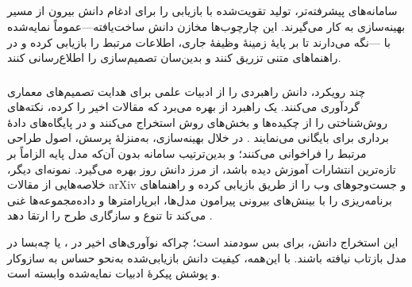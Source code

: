 \subsection[دانش بیرونی از رهگذر تولید تقویت‌شده با بازیابی]{}

سامانه‌های پیشرفته‌تر، تولید تقویت‌شده با بازیابی را برای ادغام دانش بیرون از مسیر بهینه‌سازی به کار می‌گیرند. این چارچوب‌ها مخازن دانش ساخت‌یافته—عموماً  نمایه‌شده با —نگه می‌دارند تا بر پایهٔ زمینهٔ وظیفهٔ جاری، اطلاعات مرتبط را بازیابی کرده و در راهنماهای متنی تزریق کنند و بدین‌سان تصمیم‌سازی را اطلاع‌رسانی کنند.

\subsubsection{\protect{}}

چند رویکرد، دانش راهبردی را از ادبیات علمی برای هدایت تصمیم‌های معماری گردآوری می‌کنند. یک راهبرد از  بهره می‌برد که مقالات اخیر را  کرده، نکته‌های روش‌شناختی را از چکیده‌ها و بخش‌های روش استخراج می‌کنند و در پایگاه‌های دادهٔ برداری برای  بایگانی می‌نمایند \cite{Yang2025NADER}. در خلال بهینه‌سازی،  به‌منزلهٔ پرسش، اصول طراحی مرتبط را فراخوانی می‌کنند؛ و بدین‌ترتیب سامانه بدون آن‌که مدل پایه الزاماً بر تازه‌ترین انتشارات آموزش دیده باشد، از مرز دانش روز بهره می‌گیرد. نمونه‌ای دیگر، خلاصه‌هایی از مقالات arXiv و جست‌وجوهای وب را از طریق  بازیابی کرده و راهنماهای برنامه‌ریزی را با بینش‌های بیرونی پیرامون مدل‌ها، ابرپارامترها و داده‌مجموعه‌ها غنی می‌کند تا تنوع و سازگاری طرح را ارتقا دهد \cite{trirat2025automlagent}.

این استخراج دانش، برای  بس سودمند است؛ چراکه نوآوری‌های اخیر در ،  یا  چه‌بسا در  مدل بازتاب نیافته باشند. با این‌همه، کیفیت دانش بازیابی‌شده به‌نحو حساس به سازوکار  و پوشش پیکرهٔ ادبیات نمایه‌شده وابسته است.

